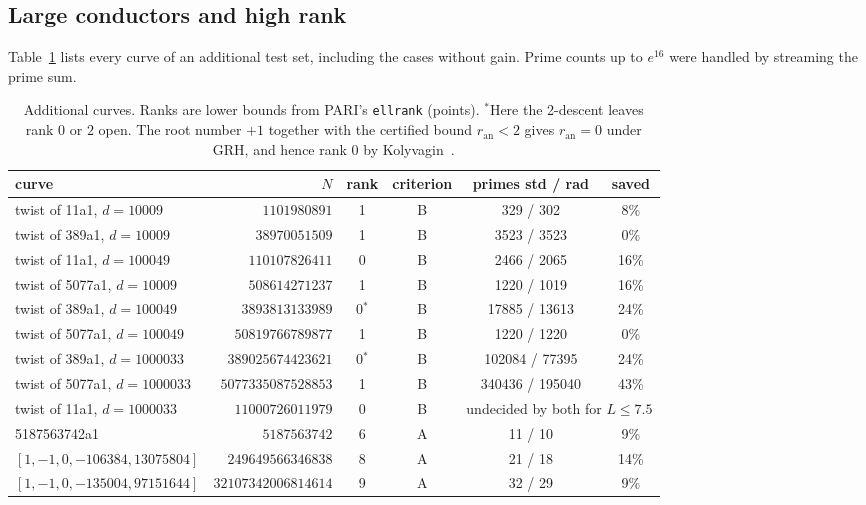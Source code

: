 \documentclass[11pt]{amsart}
\theoremstyle{remark}
\theoremstyle{definition}
\newcommand{\ran}{r_{\mathrm{an}}}
\begin{document}
\subsection{Large conductors and high rank}
Table~\ref{tab:big} lists every curve of an additional test set, including the cases without gain. Prime counts up to $e^{16}$ were handled by streaming the prime sum.

\begin{table}[h]
\centering\small
\begin{tabular}{lrcccc}
\toprule
curve & $N$ & rank & criterion & primes std / rad & saved\\
\midrule
twist of 11a1, $d=10009$     & $1101980891$         & 1 & B & 329 / 302 & 8\%\\
twist of 389a1, $d=10009$    & $38970051509$        & 1 & B & 3523 / 3523 & 0\%\\
twist of 11a1, $d=100049$    & $110107826411$       & 0 & B & 2466 / 2065 & 16\%\\
twist of 5077a1, $d=10009$   & $508614271237$       & 1 & B & 1220 / 1019 & 16\%\\
twist of 389a1, $d=100049$   & $3893813133989$      & 0$^{\ast}$ & B & 17885 / 13613 & 24\%\\
twist of 5077a1, $d=100049$  & $50819766789877$     & 1 & B & 1220 / 1220 & 0\%\\
twist of 389a1, $d=1000033$  & $389025674423621$    & 0$^{\ast}$ & B & 102084 / 77395 & 24\%\\
twist of 5077a1, $d=1000033$ & $5077335087528853$   & 1 & B & 340436 / 195040 & 43\%\\
twist of 11a1, $d=1000033$   & $11000726011979$     & 0 & B & \multicolumn{2}{c}{undecided by both for $L\le7.5$}\\
\midrule
5187563742a1                 & $5187563742$         & 6 & A & 11 / 10 & 9\%\\
$[1,-1,0,-106384,13075804]$  & $249649566346838$    & 8 & A & 21 / 18 & 14\%\\
$[1,-1,0,-135004,97151644]$  & $32107342006814614$  & 9 & A & 32 / 29 & 9\%\\
\bottomrule
\end{tabular}
\caption{Additional curves. Ranks are lower bounds from PARI's \texttt{ellrank} (points). $^{\ast}$Here the 2-descent leaves rank $0$ or $2$ open. The root number $+1$ together with the certified bound $\ran<2$ gives $\ran=0$ under GRH, and hence rank $0$ by Kolyvagin~\cite{Kolyvagin}.}
\label{tab:big}
\end{table}
\end{document}
